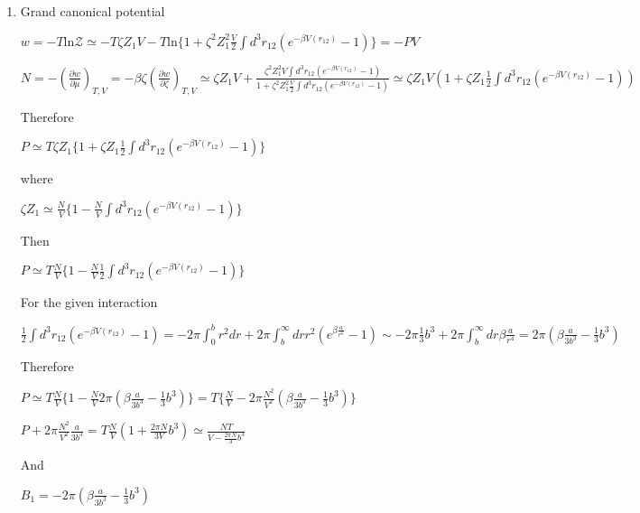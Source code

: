 \documentclass{article}
\begin{document}
    \begin{enumerate}
\def\labelenumi{(\alph{enumi})}
\setcounter{enumi}{1}
\itemsep1pt\parskip0pt
\item
  Grand canonical potential


$w= -T\mbox{ln}\mathcal{Z} \simeq -T \zeta Z_1 V-T\mbox{ln}\{1+ \zeta^2  Z_1^2 \frac{V}{2} \int d^3r_{12}  (e^{ -\beta V(r_{12})} -1)\}=-PV$

$N = -(\frac{\partial w}{\partial \mu})_{T, V} = -\beta \zeta (\frac{\partial w}{\partial \zeta})_{T, V}\simeq \zeta   Z_1 V+ \frac{\zeta^2  Z_1^2 V\int d^3r_{12}  (e^{ -\beta V(r_{12})} -1)}{1+ \zeta^2  Z_1^2 \frac{V}{2}\int d^3r_{12}  (e^{ -\beta V(r_{12})} -1)} \simeq  \zeta   Z_1 V (1+  \zeta Z_1\frac{1}{2} \int d^3r_{12}  (e^{ -\beta V(r_{12})} -1))$

Therefore

$P \simeq T \zeta Z_1 \{1+ \zeta Z_1\frac{1}{2}\int d^3r_{12}  (e^{ -\beta V(r_{12})} -1)\}$

where

$ \zeta   Z_1 \simeq \frac{N}{V} \{ 1-  \frac{N}{V}\int d^3r_{12}  (e^{ -\beta V(r_{12})} -1)\}$

Then

$P  \simeq T \frac{N}{ V} \{1-\frac{N}{ V} \frac{1}{2}\int d^3r_{12}  (e^{ -\beta V(r_{12})} -1)\}$

For the given interaction

$\frac{1}{2}  \int d^3r_{12} (e^{ -\beta V(r_{12})} -1) =-2\pi   \int_0^b r^2 dr+ 2\pi  \int_b^{\infty} dr r^2(e^{ \beta \frac{a}{r^6}} -1) \sim  -2\pi  \frac{1}{3} b^3 + 2\pi  \int_b^{\infty} dr  \beta \frac{a}{r^4} = 2\pi  (\beta \frac{a}{3b^3} -\frac{1}{3} b^3)  $

Therefore

$P \simeq T \frac{N}{ V} \{1-\frac{N}{ V} 2\pi  (\beta \frac{a}{3b^3} -\frac{1}{3} b^3)\} =  T \{\frac{N}{V}-2 \pi \frac{N^2}{V^2} (\beta \frac{a}{3b^3} -\frac{1}{3} b^3) \}$

$P+ 2 \pi \frac{N^2}{V^2}\frac{a}{3b^3} = T \frac{N}{V}(1+\frac{2 \pi N}{3 V} b^3)\simeq \frac{N T}{V-\frac{2 \pi N}{3} b^3} $

And

$B_1 = -2\pi  (\beta \frac{a}{3b^3} -\frac{1}{3} b^3)$
\end{enumerate}


    
    
    
    
\end{document}
